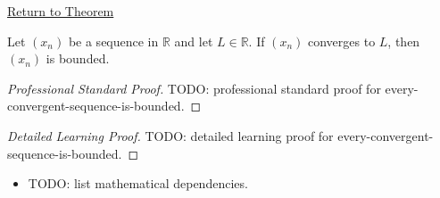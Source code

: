 \newpage
{}
\label{prf:every-convergent-sequence-is-bounded}

\begin{remark*}[Return]
\hyperref[thm:every-convergent-sequence-is-bounded]{Return to Theorem}
\end{remark*}

\begin{theorem*}
Let $(x_n)$ be a sequence in $\mathbb{R}$ and let $L \in \mathbb{R}$. If $(x_n)$ converges
to $L$, then $(x_n)$ is bounded.
\end{theorem*}

\begin{proof}[Professional Standard Proof]
\LRAProofBodyStart
TODO: professional standard proof for every-convergent-sequence-is-bounded.
\end{proof}

\begin{proof}[Detailed Learning Proof]
\LRAProofBodyStart
TODO: detailed learning proof for every-convergent-sequence-is-bounded.
\end{proof}

\begin{remark*}
\end{remark*}

\begin{dependencies}
\begin{itemize}
  \item TODO: list mathematical dependencies.
\end{itemize}
\end{dependencies}

\clearpage
